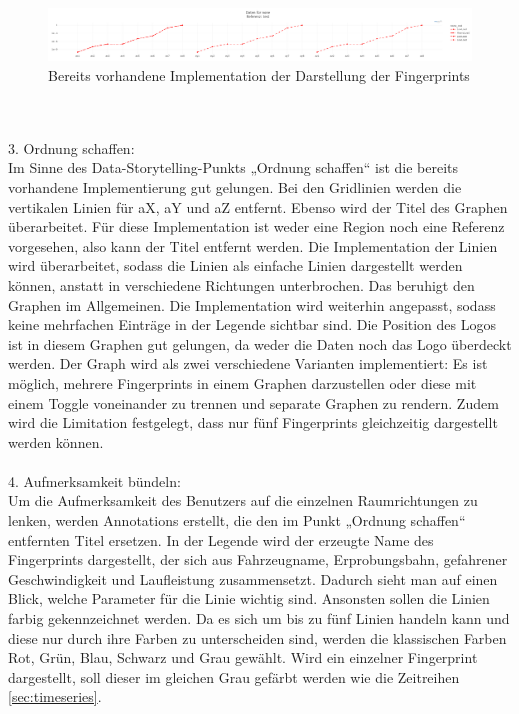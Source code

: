 \begin{figure}[!h]
    \centering
    \includegraphics[width=1\linewidth]{gfx/fingerprints_first.png}
    \caption{Bereits vorhandene Implementation der Darstellung der Fingerprints}
    \label{fig:fingerprints_first}
\end{figure}
\\\\3. Ordnung schaffen:\\
Im Sinne des Data-Storytelling-Punkts „Ordnung schaffen“ ist die bereits vorhandene Implementierung gut gelungen. Bei den Gridlinien werden die vertikalen Linien für aX, aY und aZ entfernt. Ebenso wird der Titel des Graphen überarbeitet. Für diese Implementation ist weder eine Region noch eine Referenz vorgesehen, also kann der Titel entfernt werden. Die Implementation der Linien wird überarbeitet, sodass die Linien als einfache Linien dargestellt werden können, anstatt in verschiedene Richtungen unterbrochen. Das beruhigt den Graphen im Allgemeinen. Die Implementation wird weiterhin angepasst, sodass keine mehrfachen Einträge in der Legende sichtbar sind. Die Position des Logos ist in diesem Graphen gut gelungen, da weder die Daten noch das Logo überdeckt werden. Der Graph wird als zwei verschiedene Varianten implementiert: Es ist möglich, mehrere Fingerprints in einem Graphen darzustellen oder diese mit einem Toggle voneinander zu trennen und separate Graphen zu rendern. Zudem wird die Limitation festgelegt, dass nur fünf Fingerprints gleichzeitig dargestellt werden können.\\\\
4. Aufmerksamkeit bündeln:\\
Um die Aufmerksamkeit des Benutzers auf die einzelnen Raumrichtungen zu lenken, werden Annotations erstellt, die den im Punkt „Ordnung schaffen“ entfernten Titel ersetzen. In der Legende wird der erzeugte Name des Fingerprints dargestellt, der sich aus Fahrzeugname, Erprobungsbahn, gefahrener Geschwindigkeit und Laufleistung zusammensetzt. Dadurch sieht man auf einen Blick, welche Parameter für die Linie wichtig sind. Ansonsten sollen die Linien farbig gekennzeichnet werden. Da es sich um bis zu fünf Linien handeln kann und diese nur durch ihre Farben zu unterscheiden sind, werden die klassischen Farben Rot, Grün, Blau, Schwarz und Grau gewählt. Wird ein einzelner Fingerprint dargestellt, soll dieser im gleichen Grau gefärbt werden wie die Zeitreihen \ref{sec:timeseries}.\\\\
